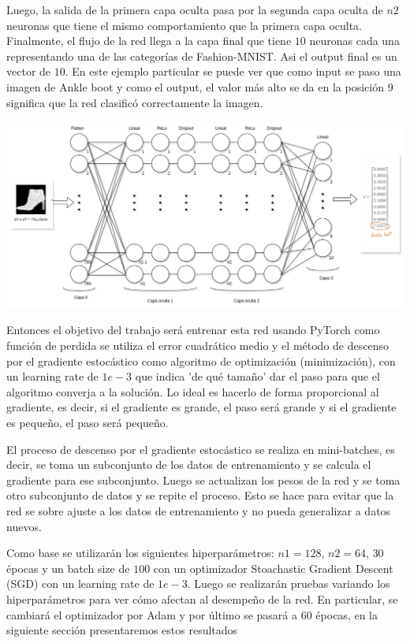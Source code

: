 \documentclass[aps,prl,reprint,groupedaddress]{revtex4-2}
\newenvironment{Figura}
  {\par\medskip\noindent\minipage{\linewidth}}
  {\endminipage\par\medskip}
\begin{document}
Luego, la salida de la primera capa oculta pasa por la segunda capa oculta de $n2$
neuronas que tiene el mismo comportamiento que la primera capa oculta. Finalmente,
el flujo de la red llega a la capa final que tiene $10$ neuronas cada una 
representando una de las categorías de Fashion-MNIST. Asi el output final es un 
vector de $10$. En este ejemplo particular se puede ver que como input se paso 
una imagen de Ankle boot y como el output, el valor más alto se da en la posición
$9$ significa que la red clasificó correctamente la imagen.

\begin{Figura}
  \centering
  \includegraphics[width=1\textwidth]{figs/arq_model.png}
  \label{fig-red}
\end{Figura}

Entonces el objetivo del trabajo será entrenar esta red usando PyTorch como 
función de perdida se utiliza el error cuadrático medio y el método de descenso 
por el gradiente estocástico como algoritmo de optimización (minimización), 
con un learning rate de $1e-3$ que indica 'de qué tamaño' dar el paso 
para que el algoritmo converja a la solución. Lo ideal es hacerlo de forma 
proporcional al gradiente, es decir, si el gradiente es grande, el paso será
grande y si el gradiente es pequeño, el paso será pequeño.

El proceso de descenso por el gradiente estocástico se realiza en mini-batches,
es decir, se toma un subconjunto de los datos de entrenamiento y se calcula el
gradiente para ese subconjunto. Luego se actualizan los pesos de la red y se
toma otro subconjunto de datos y se repite el proceso. Esto se hace para evitar
que la red se sobre ajuste a los datos de entrenamiento y no pueda generalizar
a datos nuevos.

Como base se utilizarán los siguientes hiperparámetros: $n1=128$, $n2=64$, 
$30$ épocas y un batch size de $100$ con un optimizador 
Stoachastic Gradient Descent (SGD) con un learning rate de $1e-3$. Luego se 
realizarán pruebas variando los hiperparámetros para ver cómo afectan al 
desempeño de la red. En particular, se cambiará el optimizador por Adam y 
por último se pasará a $60$ épocas, en la siguiente sección presentaremos
estos resultados
\end{document}
